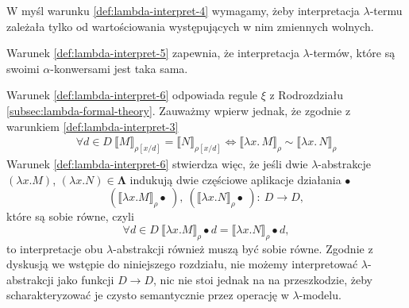 W myśl warunku \ref{def:lambda-interpret-4} wymagamy, żeby interpretacja \(\lambda\)-termu zależała tylko od wartościowania występujących w nim zmiennych wolnych. 

Warunek \ref{def:lambda-interpret-5} zapewnia, że interpretacja \(\lambda\)-termów, które są swoimi \(\alpha\)-konwersami jest taka sama.

  
Warunek \ref{def:lambda-interpret-6} odpowiada regule \(\xi\) z Rodrozdziału \ref{subsec:lambda-formal-theory}.
Zauważmy wpierw jednak, że zgodnie z warunkiem \ref{def:lambda-interpret-3}
\begin{align*}
\forall d\in D\ \llbracket M \rrbracket_{\rho[x/d]}=\llbracket N \rrbracket_{\rho[x/d]}
\iff
\llbracket\lambda x.\,M\rrbracket_\rho \sim \llbracket \lambda x.\,N\rrbracket_\rho 
\tag{\dagger}\label{eq:valuation-replace}
\end{align*}
Warunek \ref{def:lambda-interpret-6} stwierdza więc, że jeśli dwie \(\lambda\)-abstrakcje 
\((\lambda x. M)\), \((\lambda x. N)\in\mathbf{\Lambda}\) indukują dwie częściowe aplikacje działania \(\bullet\)
\[(\llbracket \lambda x. M \rrbracket_\rho\bullet\ ),\ (\llbracket \lambda x. N \rrbracket_\rho\bullet\ ):\: D\to D,\]
które są sobie równe, czyli
\[
\forall d\in D\ \llbracket \lambda x. M \rrbracket_\rho\bullet d = \llbracket \lambda x. N \rrbracket_\rho\bullet d,
\]
to interpretacje obu \(\lambda\)-abstrakcji również muszą być sobie równe. Zgodnie z dyskusją we wstępie do niniejszego rozdziału,
nie możemy interpretować \(\lambda\)-abstrakcji jako funkcji \(D\to D\), nic nie stoi jednak na na przeszkodzie, żeby scharakteryzować je  
czysto semantycznie przez operację w \(\lambda\)-modelu.




